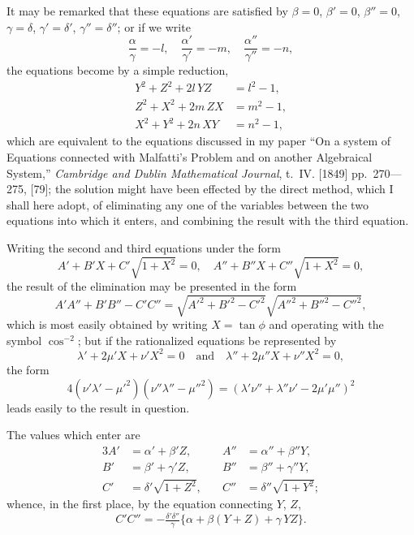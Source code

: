 \documentclass[11pt,a4paper]{book}
\begin{document}
\newpage
\setcounter{page}{68}

It may be remarked that these equations are satisfied by $\beta=0$, $\beta'=0$, $\beta''=0$, $\gamma=\delta$, $\gamma'=\delta'$, $\gamma''=\delta''$; or if we write
\[
\frac{\alpha}{\gamma} = -l, \quad \frac{\alpha'}{\gamma'} = -m, \quad \frac{\alpha''}{\gamma''} = -n,
\]
the equations become by a simple reduction,
\begin{align*}
Y^2+Z^2+2l\,YZ &= l^2-1,\\
Z^2+X^2+2m\,ZX &= m^2-1,\\
X^2+Y^2+2n\,XY &= n^2-1,
\end{align*}
which are equivalent to the equations discussed in my paper ``On a system of Equations connected with Malfatti's Problem and on another Algebraical System,'' \textit{Cambridge and Dublin Mathematical Journal}, t.~IV. [1849] pp.~270---275, [79]; the solution might have been effected by the direct method, which I shall here adopt, of eliminating any one of the variables between the two equations into which it enters, and combining the result with the third equation.

Writing the second and third equations under the form
\[
A'+B'X+C'\sqrt{1+X^2} = 0, \quad A''+B''X+C''\sqrt{1+X^2} = 0,
\]
the result of the elimination may be presented in the form
\[
A'A''+B'B''-C'C'' = \sqrt{A'^2+B'^2-C'^2}\sqrt{A''^2+B''^2-C''^2},
\]
which is most easily obtained by writing $X=\tan\phi$ and operating with the symbol $\cos^{-2}$; but if the rationalized equations be represented by
\[
\lambda'+2\mu'X+\nu'X^2 = 0 \quad \text{and} \quad \lambda''+2\mu''X+\nu''X^2 = 0,
\]
the form
\[
4(\nu'\lambda'-\mu'^2)(\nu''\lambda''-\mu''^2) = (\lambda'\nu''+\lambda''\nu'-2\mu'\mu'')^2
\]
leads easily to the result in question.

The values which enter are
\begin{alignat*}{3}
A' &= \alpha'+\beta'Z, \quad& A'' &= \alpha''+\beta''Y,\\
B' &= \beta'+\gamma'Z, \quad& B'' &= \beta''+\gamma''Y,\\
C' &= \delta'\sqrt{1+Z^2}, \quad& C'' &= \delta''\sqrt{1+Y^2};
\end{alignat*}
whence, in the first place, by the equation connecting $Y$, $Z$,
\[
C'C'' = -\tfrac{\delta'\delta''}{\gamma}\{\alpha+\beta(Y+Z)+\gamma\,YZ\}.
\]


\newpage
\setcounter{page}{69}
\end{document}
